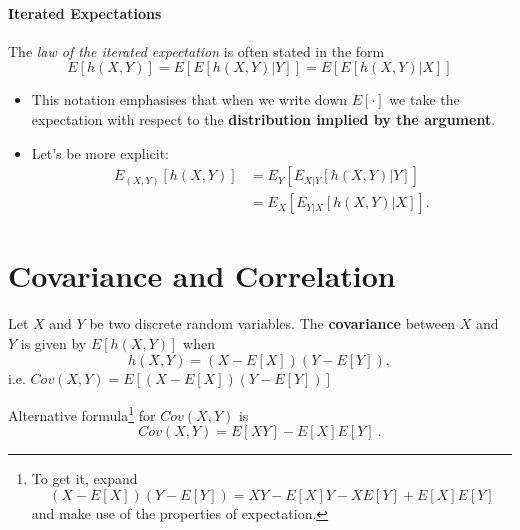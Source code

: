 \documentclass[notes=show,handout]{beamer}\usepackage[]{graphicx}\usepackage[]{color}
\begin{document}
\begin{frame}{\secname}%
  \framesubtitle{Iterated Expectations}
  \begin{definition}
  The \textit{law of the iterated expectation} is often stated in the
  form
  \begin{equation*}
  E[h(X,Y)]=E[E[h(X,Y)|Y]]=E[E[h(X,Y)|X]]
  \end{equation*}
  \end{definition}

  \begin{itemize}
    \item This notation emphasises that when we write down $E[\cdot]$ we take the
    expectation with respect to the \textbf{distribution implied by the argument}.
    \item Let's be more explicit:
    \begin{align*}
      E_{(X,Y)}[h(X,Y)] &=E_{Y}\left[E_{X|Y}\left[h(X,Y) \vert Y \right]\right] \\
                        &=E_{X}[E_{Y|X}[h(X,Y) \vert X]].
    \end{align*}
  \end{itemize}
\end{frame}


\section{Covariance and Correlation}

\begin{frame}{\secname}
  \begin{definition}
  Let $X$ and $Y$ be two discrete random variables.
  The \textbf{covariance} between $X$ and\textbf{\ }$Y$ is given by $%
  E\left[ h\left(X,Y\right) \right] $ when%
  \begin{equation*}
  h\left(X,Y\right) =%
  \left(X-E\left[ X\right] \right) \left( Y-E\left[ Y\right] \right),%
  \end{equation*}
  i.e. $Cov\left(X,Y\right) =E\left[ \left(X-E\left[ X\right] \right)
  \left(Y-E\left[ Y\right] \right) \right] $
  \end{definition}

  Alternative formula\footnote{To get it, expand
  $$\left(X-E\left[ X\right] \right) \left( Y-E\left[ Y\right] \right)=XY-E\left[ X\right]Y -XE\left[ Y\right] +E\left[ X\right]E\left[ Y\right]$$ and make use of the properties of expectation.} for $Cov(X,Y)$ is%
  \begin{equation}
  \boxed{Cov\left( X,Y\right) =E\left[ XY\right] -E\left[ X\right] E\left[ Y\right]\ .} \label{Cov}
  \end{equation}
\end{frame}
\end{document}
